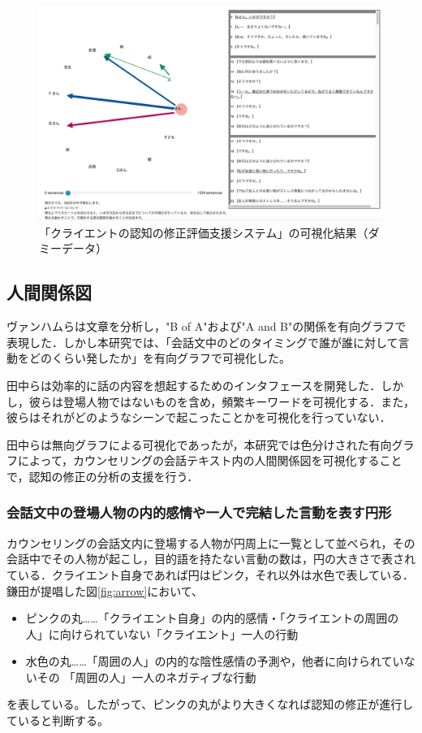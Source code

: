 \documentclass[shuuron]{kuee}
\begin{document}
\begin{figure}
  \begin{center}
    \includegraphics[width=\linewidth]{dummyChara.png}
  \end{center}
  \caption{「クライエントの認知の修正評価支援システム」の可視化結果（ダミーデータ）}
  \label{fig:dummyChara}
\end{figure}

\subsection{人間関係図}

ヴァンハムら\cite{van2009mapping}は文章を分析し，"B of A"および"A and B"の関係を有向グラフで表現した．しかし本研究では、「会話文中のどのタイミングで誰が誰に対して言動をどのくらい発したか」を有向グラフで可視化した。

田中ら\cite{tanaka}は効率的に話の内容を想起するためのインタフェースを開発した．しかし，彼らは登場人物ではないものを含め，頻繁キーワードを可視化する．また，彼らはそれがどのようなシーンで起こったことかを可視化を行っていない．

田中らは無向グラフによる可視化であったが，本研究では色分けされた有向グラフによって，カウンセリングの会話テキスト内の人間関係図を可視化することで，認知の修正の分析の支援を行う．

\subsubsection{会話文中の登場人物の内的感情や一人で完結した言動を表す円形}

カウンセリングの会話文内に登場する人物が円周上に一覧として並べられ，その会話中でその人物が起こし，目的語を持たない言動の数は，円の大きさで表されている．クライエント自身であれば円はピンク，それ以外は水色で表している．鎌田\cite{鎌田穣2002臨床}が提唱した図\ref{fig:arrow}において、
\begin{itemize}
  \item ピンクの丸……「クライエント自身」の内的感情・「クライエントの周囲の人」に向けられていない「クライエント」一人の行動
  \item 水色の丸……「周囲の人」の内的な陰性感情の予測や，他者に向けられていないその
  「周囲の人」一人のネガティブな行動
\end{itemize}
を表している。したがって、ピンクの丸がより大きくなれば認知の修正が進行していると判断する。
\end{document}
